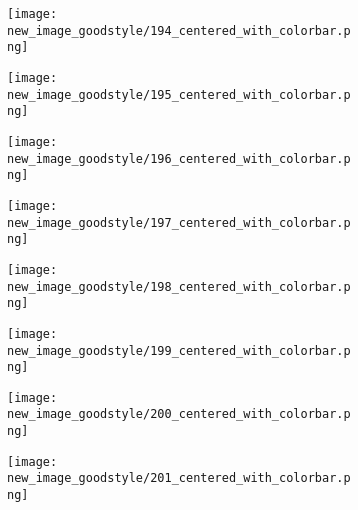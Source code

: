 \documentclass[a4paper,12pt]{article}
\begin{document}
\begin{figure}[H]
  \begin{subfigure}{0.11\textwidth}
    \texttt{[image: new\_image\_goodstyle/194\_centered\_with\_colorbar.png]}
  \end{subfigure}
  \hfill
  \begin{subfigure}{0.11\textwidth}
    \texttt{[image: new\_image\_goodstyle/195\_centered\_with\_colorbar.png]}
  \end{subfigure}
  \hfill
  \begin{subfigure}{0.11\textwidth}
    \texttt{[image: new\_image\_goodstyle/196\_centered\_with\_colorbar.png]}
  \end{subfigure}
  \hfill
  \begin{subfigure}{0.11\textwidth}
    \texttt{[image: new\_image\_goodstyle/197\_centered\_with\_colorbar.png]}
  \end{subfigure}
  \hfill
  \begin{subfigure}{0.11\textwidth}
    \texttt{[image: new\_image\_goodstyle/198\_centered\_with\_colorbar.png]}
  \end{subfigure}
  \hfill
  \begin{subfigure}{0.11\textwidth}
    \texttt{[image: new\_image\_goodstyle/199\_centered\_with\_colorbar.png]}
  \end{subfigure}
  \hfill
  \begin{subfigure}{0.11\textwidth}
    \texttt{[image: new\_image\_goodstyle/200\_centered\_with\_colorbar.png]}
  \end{subfigure}
  \hfill
  \begin{subfigure}{0.11\textwidth}
    \texttt{[image: new\_image\_goodstyle/201\_centered\_with\_colorbar.png]}
  \end{subfigure}
  \hfill
\end{figure}
\end{document}
